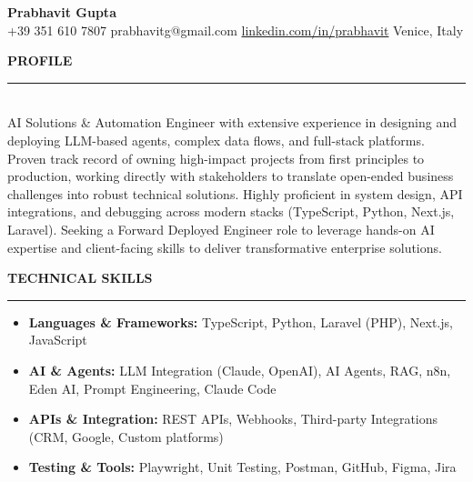 \documentclass[10pt, a4paper]{article}
\begin{document}
\begin{center}
    {\huge \textbf{Prabhavit Gupta}} \\
    \vspace{0.1cm}
    +39 351 610 7807 \quad prabhavitg@gmail.com \quad \href{https://www.linkedin.com/in/prabhavit/}{linkedin.com/in/prabhavit} \quad Venice, Italy
\end{center}

\vspace{0.3cm}
\noindent \textbf{PROFILE} \\
\noindent\rule{\textwidth}{0.4pt} \\
AI Solutions \& Automation Engineer with extensive experience in designing and deploying LLM-based agents, complex data flows, and full-stack platforms. Proven track record of owning high-impact projects from first principles to production, working directly with stakeholders to translate open-ended business challenges into robust technical solutions. Highly proficient in system design, API integrations, and debugging across modern stacks (TypeScript, Python, Next.js, Laravel). Seeking a Forward Deployed Engineer role to leverage hands-on AI expertise and client-facing skills to deliver transformative enterprise solutions.

\vspace{0.3cm}
\noindent \textbf{TECHNICAL SKILLS} \\
\noindent\rule{\textwidth}{0.4pt}
\begin{itemize}[leftmargin=0.5cm, nosep]
    \item \textbf{Languages \& Frameworks:} TypeScript, Python, Laravel (PHP), Next.js, JavaScript
    \item \textbf{AI \& Agents:} LLM Integration (Claude, OpenAI), AI Agents, RAG, n8n, Eden AI, Prompt Engineering, Claude Code
    \item \textbf{APIs \& Integration:} REST APIs, Webhooks, Third-party Integrations (CRM, Google, Custom platforms)
    \item \textbf{Testing \& Tools:} Playwright, Unit Testing, Postman, GitHub, Figma, Jira
\end{itemize}
\end{document}
